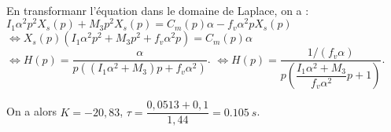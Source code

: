 \ifprof
\begin{corrige}~\\
En transformanr l'équation dans le domaine de Laplace, on a : $I_1\alpha^2 p^2X_s(p) + M_3p^2X_s(p) =C_m(p)\alpha  -f_v\alpha^2 pX_s(p)$
$\Leftrightarrow X_s(p) \left(I_1\alpha^2 p^2+ M_3p^2+f_v\alpha^2 p\right) =C_m(p)\alpha  $
$\Leftrightarrow H(p) = \dfrac{\alpha}{p\left(\left(I_1\alpha^2+ M_3\right)p+f_v\alpha^2 \right)} $.
$\Leftrightarrow H(p) = \dfrac{1/\left(f_v\alpha\right)}{p\left(\dfrac{I_1\alpha^2+ M_3}{f_v\alpha^2}p+1 \right)} $.

On a alors $K=-20,83$, $\tau = \dfrac{0,0513+ 0,1}{1,44}=\SI{0,105}{s}$.
\end{corrige}
\else
\fi


